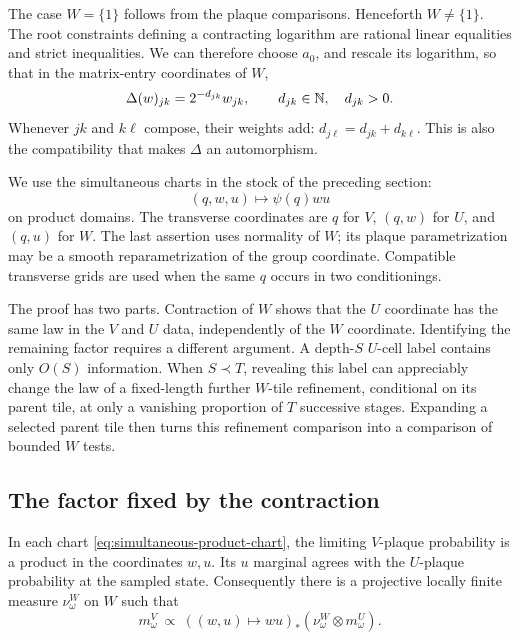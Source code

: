 The case \(W=\{1\}\) follows from the plaque comparisons.  Henceforth
\(W\ne\{1\}\).  The root constraints defining a contracting logarithm
are rational linear equalities and strict inequalities.  We can
therefore choose \(a_0\), and rescale its logarithm, so that in the
matrix-entry coordinates of \(W\),
\begin{equation}\label{eq:integer-contraction}
       \Delta(w)_{jk}=2^{-d_{jk}}w_{jk},
       \qquad d_{jk}\in\mathbb N,\quad d_{jk}>0.
\end{equation}
Whenever \(jk\) and \(k\ell\) compose, their weights add:
\(d_{j\ell}=d_{jk}+d_{k\ell}\).
This is also the compatibility that makes \(\Delta\) an automorphism.

We use the simultaneous charts in the stock of the preceding section:
\begin{equation}\label{eq:simultaneous-product-chart}
        (q,w,u)\longmapsto\psi(q)wu
\end{equation}
on product domains.  The transverse coordinates are \(q\) for \(V\),
\((q,w)\) for \(U\), and \((q,u)\) for \(W\).  The last assertion uses
normality of \(W\); its plaque parametrization may be a smooth
reparametrization of the group coordinate.  Compatible transverse
grids are used when the same \(q\) occurs in two conditionings.

The proof has two parts.  Contraction of \(W\) shows that the \(U\)
coordinate has the same law in the \(V\) and \(U\) data, independently
of the \(W\) coordinate.  Identifying the remaining factor requires a
different argument.  A depth-\(S\) \(U\)-cell label contains only
\(O(S)\) information.  When \(S\prec T\), revealing this label can
appreciably change the law of a fixed-length further \(W\)-tile
refinement, conditional on its parent tile, at only a vanishing
proportion of \(T\) successive stages.  Expanding a selected parent
tile then turns this refinement comparison into a comparison of
bounded \(W\) tests.

\subsection{The factor fixed by the contraction}

\begin{lemma}\label{lem:u-factor}
In each chart \eqref{eq:simultaneous-product-chart}, the limiting
\(V\)-plaque probability is a product in the coordinates \(w,u\).
Its \(u\) marginal agrees with the \(U\)-plaque probability at the
sampled state.  Consequently there is a projective locally finite
measure \(\nu^W_\omega\) on \(W\) such that
\begin{equation}\label{eq:provisional-product}
 m^V_\omega
 \ \propto\
 ((w,u)\longmapsto wu)_*
          (\nu^W_\omega\otimes m^U_\omega).
\end{equation}
\end{lemma}

